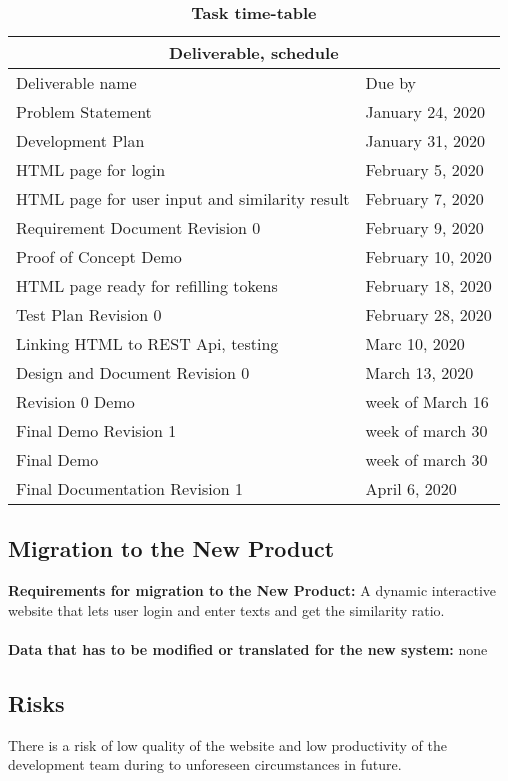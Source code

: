 \documentclass[12pt, titlepage]{article}
\begin{document}
\begin{table}
    \caption{\bf Task time-table}
    \begin{tabular}{ |p{10cm}|p{6cm}|  }
     \hline
     \multicolumn{2}{|c|}{Deliverable, schedule} \\
     \hline
     Deliverable name & Due by \\
     \hline
     Problem Statement & January 24, 2020 \\
     Development Plan  & January 31, 2020\\
     HTML page for login & February 5, 2020 \\
     HTML page for user input and similarity result & February 7, 2020 \\
     Requirement Document Revision 0 & February 9, 2020\\
     Proof of Concept Demo & February 10, 2020 \\
     HTML page ready for refilling tokens & February 18, 2020 \\
     Test Plan Revision 0 & February 28, 2020 \\
     Linking HTML to REST Api, testing & Marc 10, 2020 \\
     Design and Document Revision 0 & March 13, 2020\\
     Revision 0 Demo & week of March 16\\
     Final Demo Revision 1 & week of march 30\\
     Final Demo & week of march 30\\
     Final Documentation Revision 1 & April 6, 2020\\
     \hline
    \end{tabular}
\end{table}

\subsection{Migration to the New Product}
\textbf{Requirements for migration to the New Product:} A dynamic interactive website that lets user login and enter texts and get the similarity ratio. \\
\\
\textbf{Data that has to be modified or translated for the new system:} none

\subsection{Risks}
There is a risk of low quality of the website and  low productivity of the development team during to unforeseen circumstances in future. 
\end{document}
